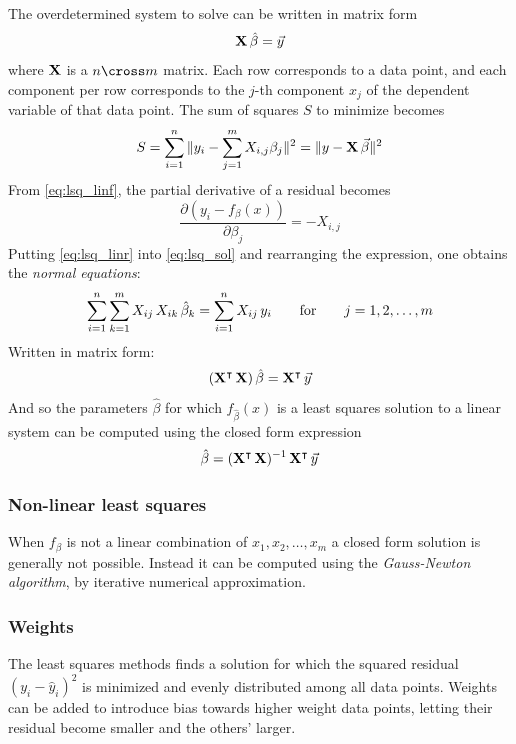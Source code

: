 The overdetermined system to solve can be written in matrix form
\begin{equation}
\mathbf{X} \, \hat{\beta} = \vec{y}
\end{equation}
where $\mathbf{X}$ is a $n \cross m$ matrix. Each row corresponds to a data point, and each component per row corresponds to the $j$-th component $x_j$ of the dependent variable of that data point. The sum of squares $S$ to minimize becomes
\begin{equation}
S = \sum_{i=1}^{n} \| y_i - \sum_{j=1}^{m} X_{i,j} \beta_{j} \|^2 = \| y - \mathbf{X} \, \vec{\beta} \|^2
\end{equation}
From \ref{eq:lsq_linf}, the partial derivative of a residual becomes
\begin{equation} \label{eq:lsq_linr}
\frac{\partial (y_i - f_{\beta}(x))}{\partial \beta_j} = - X_{i,j}
\end{equation}
Putting \ref{eq:lsq_linr} into \ref{eq:lsq_sol} and rearranging the expression, one obtains the \emph{normal equations}:
\begin{equation}
\sum_{i=1}^{n} \sum_{k=1}^{m} X_{ij} \, X_{ik} \, \hat{\beta}_k = \sum_{i=1}^{n} X_{ij} \, y_{i}
\hspace{7mm} \text{for} \hspace{7mm}
j = 1, 2, \dots, m
\end{equation}
Written in matrix form:
\begin{equation}
(\mathbf{X}^\intercal \, \mathbf{X}) \, \hat{\beta} = \mathbf{X}^\intercal \, \vec{y}
\end{equation}
And so the parameters $\hat{\beta}$ for which $f_{\hat{\beta}}(x)$ is a least squares solution to a linear system can be computed using the closed form expression
\begin{equation}
\hat{\beta} = (\mathbf{X}^\intercal \, \mathbf{X})^{-1} \, \mathbf{X}^\intercal \, \vec{y}
\end{equation}

\subsubsection{Non-linear least squares}
When $f_{\beta}$ is not a linear combination of $x_1, x_2, \dots, x_m$ a closed form solution is generally not possible. Instead it can be computed using the \emph{Gauss-Newton algorithm}, by iterative numerical approximation.

\subsubsection{Weights}
The least squares methods finds a solution for which the squared residual $(y_i - \hat{y}_i)^2$ is minimized and evenly distributed among all data points. Weights can be added to introduce bias towards higher weight data points, letting their residual become smaller and the others' larger.


